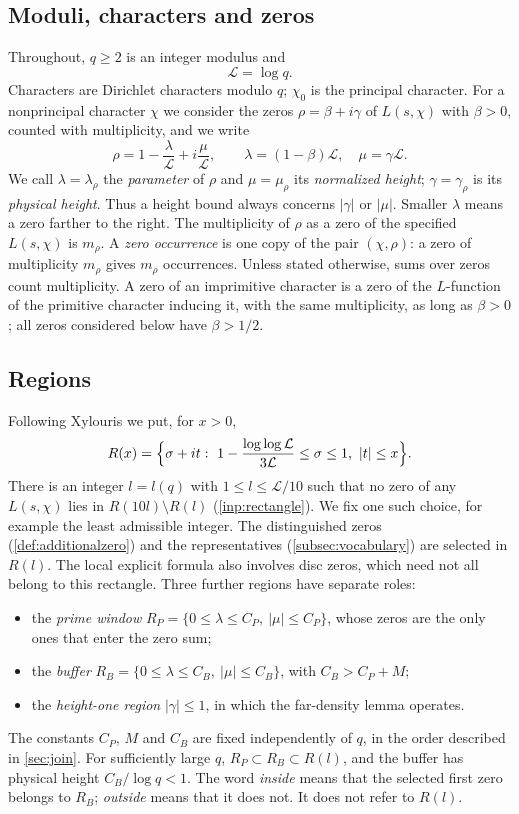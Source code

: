 \documentclass[11pt]{amsart}
\numberwithin{equation}{section}
\theoremstyle{plain}
\theoremstyle{definition}
\theoremstyle{remark}
\newcommand{\LL}{\mathcal{L}}
\newcommand{\1}{\mathbf{1}}
\begin{document}
\subsection{Moduli, characters and zeros}
Throughout, $q\ge2$ is an integer modulus and
\[
  \LL=\log q .
\]
Characters are Dirichlet characters modulo $q$; $\chi_0$ is the principal character. For a
nonprincipal character $\chi$ we consider the zeros $\rho=\beta+i\gamma$ of $L(s,\chi)$ with
$\beta>0$, counted with multiplicity, and we write
\begin{equation}\label{eq:normalized}
  \rho=1-\frac{\lambda}{\LL}+i\frac{\mu}{\LL},\qquad \lambda=(1-\beta)\LL,\quad \mu=\gamma\LL .
\end{equation}
We call $\lambda=\lambda_\rho$ the \emph{parameter} of $\rho$ and $\mu=\mu_\rho$ its
\emph{normalized height}; $\gamma=\gamma_\rho$ is its \emph{physical height}. Thus a height
bound always concerns $|\gamma|$ or $|\mu|$. Smaller $\lambda$ means a zero farther to the
right. The multiplicity of $\rho$ as a zero of the specified $L(s,\chi)$ is $m_\rho$.
A \emph{zero occurrence} is one copy of the pair $(\chi,\rho)$: a zero of multiplicity
$m_\rho$ gives $m_\rho$ occurrences. Unless stated otherwise, sums over zeros count
multiplicity. A zero of an imprimitive character is a zero of the
$L$-function of the primitive character inducing it, with the same multiplicity, as long as
$\beta>0$; all zeros considered below have $\beta>1/2$.

\subsection{Regions}
Following Xylouris \cite[(3.7)]{Xylouris2011nullstellen} we put, for $x>0$,
\[
  R(x)=\Bigl\{\sigma+it:\ 1-\frac{\log\log\LL}{3\LL}\le\sigma\le1,\ |t|\le x\Bigr\}.
\]
There is an integer $l=l(q)$ with $1\le l\le\LL/10$ such that no zero of any $L(s,\chi)$ lies in
$R(10l)\setminus R(l)$ (\cref{inp:rectangle}). We fix one such choice, for example the least
admissible integer. The distinguished zeros (\cref{def:additionalzero}) and the representatives
(\cref{subsec:vocabulary}) are selected in $R(l)$.
The local explicit formula also involves disc zeros, which need not all belong to this
rectangle. Three further regions have separate roles:
\begin{itemize}
  \item the \emph{prime window} $R_P=\{0\le\lambda\le C_P,\ |\mu|\le C_P\}$, whose zeros are the only
    ones that enter the zero sum;
  \item the \emph{buffer} $R_B=\{0\le\lambda\le C_B,\ |\mu|\le C_B\}$, with $C_B>C_P+M$;
  \item the \emph{height-one region} $|\gamma|\le1$, in which the far-density lemma operates.
\end{itemize}
The constants $C_P$, $M$ and $C_B$ are fixed independently of $q$, in the order described in
\cref{sec:join}. For sufficiently large $q$, $R_P\subset R_B\subset R(l)$, and the buffer
has physical height $C_B/\log q<1$. The word \emph{inside} means that the selected first
zero belongs to $R_B$; \emph{outside} means that it does not. It does not refer to $R(l)$.
\end{document}
